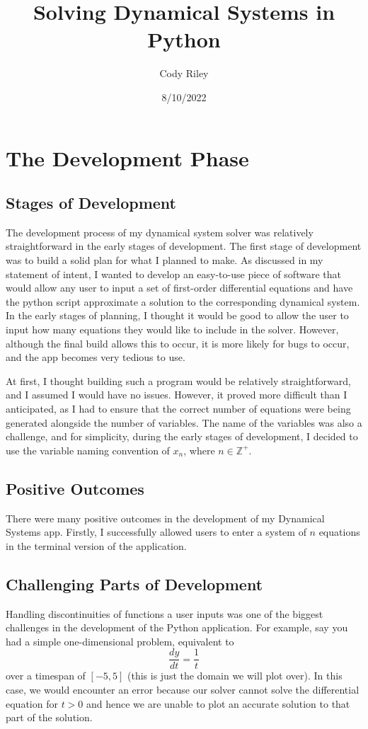 \documentclass[12pt]{report}
\title{Solving Dynamical Systems in Python}
\author{Cody Riley}
\date{8/10/2022}
\begin{document}
\maketitle
\newpage
\chapter{The Development Phase}
\section{Stages of Development}
The development process of my dynamical system solver was relatively straightforward in the early stages of development. The first stage of development was to build a solid plan for what I planned to make. As discussed in my statement of intent, I wanted to develop an easy-to-use piece of software that would allow any user to input a set of first-order differential equations and have the python script approximate a solution to the corresponding dynamical system. In the early stages of planning, I thought it would be good to allow the user to input how many equations they would like to include in the solver. However, although the final build allows this to occur, it is more likely for bugs to occur, and the app becomes very tedious to use.
\smallskip

At first, I thought building such a program would be relatively straightforward, and I assumed I would have no issues. However, it proved more difficult than I anticipated, as I had to ensure that the correct number of equations were being generated alongside the number of variables. The name of the variables was also a challenge, and for simplicity, during the early stages of development, I decided to use the variable naming convention of $x_{n}$, where $n \in \mathbb{Z}^{+}$.
\section{Positive Outcomes}
There were many positive outcomes in the development of my Dynamical Systems app. Firstly, I successfully allowed users to enter a system of $n$ equations in the terminal version of the application.
\section{Challenging Parts of Development}
Handling discontinuities of functions a user inputs was one of the biggest challenges in the development of the Python application. For example, say you had a simple one-dimensional problem, equivalent to
\begin{equation*}
    \frac{dy}{dt} = \frac{1}{t} 
\end{equation*}
over a timespan of $[-5,5]$ (this is just the domain we will plot over). In this case, we would encounter an error because our solver cannot solve the differential equation for $t > 0$ and hence we are unable to plot an accurate solution to that part of the solution.
\end{document}
